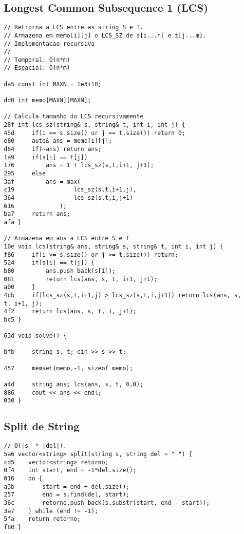 \documentclass[11pt, a4paper, twoside]{article}
\begin{document}
\subsection{Longest Common Subsequence 1 (LCS)}
\begin{lstlisting}
// Retrorna a LCS entre as string S e T.
// Armazena em memo[i][j] o LCS_SZ de s[i...n] e t[j...m].
// Implementacao recursiva
//
// Temporal: O(n*m)
// Espacial: O(n*m)

da5 const int MAXN = 1e3+10;

dd0 int memo[MAXN][MAXN];

// Calcula tamanho do LCS recursivamente
28f int lcs_sz(string& s, string& t, int i, int j) {
45d 	if(i == s.size() or j == t.size()) return 0;
e80 	auto& ans = memo[i][j];
d64 	if(~ans) return ans;
1a9 	if(s[i] == t[j])
176 		ans = 1 + lcs_sz(s,t,i+1, j+1);
295 	else
3af 		ans = max(
c19 				lcs_sz(s,t,i+1,j),
364 				lcs_sz(s,t,i,j+1)
616 			);
ba7 	return ans;
afa }

// Armazena em ans a LCS entre S e T
10e void lcs(string& ans, string& s, string& t, int i, int j) {
f86 	if(i >= s.size() or j >= t.size()) return;
524 	if(s[i] == t[j]) {
b80 		ans.push_back(s[i]);
081 		return lcs(ans, s, t, i+1, j+1);
a00 	}
4cb 	if(lcs_sz(s,t,i+1,j) > lcs_sz(s,t,i,j+1)) return lcs(ans, s, t, i+1, j);
4f2 	return lcs(ans, s, t, i, j+1);
bc5 }

63d void solve() {
    
bfb 	string s, t; cin >> s >> t;
    	
457 	memset(memo,-1, sizeof memo);
    
a4d 	string ans; lcs(ans, s, t, 0,0);
886 	cout << ans << endl;
030 }

\end{lstlisting}

\subsection{Split de String}
\begin{lstlisting}
// O(|s| * |del|).
5a6 vector<string> split(string s, string del = " ") {
cd5    vector<string> retorno;
0f4    int start, end = -1*del.size();
016    do {
a3b        start = end + del.size();
257        end = s.find(del, start);
36c        retorno.push_back(s.substr(start, end - start));
3a7    } while (end != -1);
5fa    return retorno;
f80 }
\end{lstlisting}

\pagebreak
\end{document}
